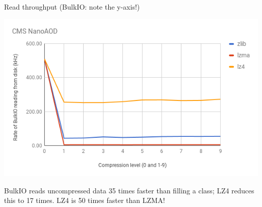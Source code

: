 \documentclass{beamer}
\begin{document}
\begin{frame}{Read throughput (BulkIO: note the y-axis!)}
\begin{center}
\includegraphics[width=\linewidth]{bulk-vs-compression.png}
\end{center}

BulkIO reads uncompressed data 35 times faster than filling a class; LZ4 reduces this to 17 times. LZ4 is 50 times faster than LZMA!
\end{frame}
\end{document}
